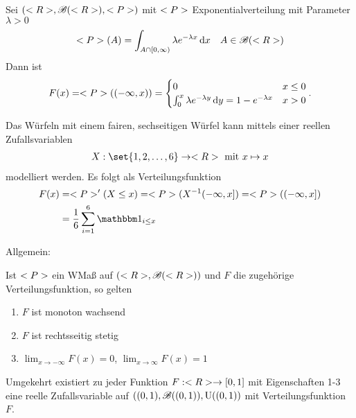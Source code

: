 
\begin{example}
	Sei $(<R>, \mathscr{B}(<R>),<P>)$ mit $<P>$ Exponentialverteilung mit Parameter $\lambda > 0$
	\begin{align}
		<P>(A) = \int_{A \cap [0,\infty)}\lambda e^{-\lambda x} \,\mathrm{d} x \quad A \in \mathscr{B}(<R>)\notag
	\end{align}
	Dann ist
	\begin{align}
		F(x) = <P>((-\infty, x)) = \begin{cases}
		0 &x \le 0\\
		\int_{0}^{x} \lambda e^{-\lambda y} \,\mathrm{d} y = 1 - e^{-\lambda x} &x > 0
		\end{cases}.\notag
	\end{align}
\end{example}

\begin{center}
	
\end{center}

\begin{example}
	Das Würfeln mit einem fairen, sechseitigen Würfel kann mittels einer reellen Zufallsvariablen
	\begin{align}
		X: \set{1,2,\dots, 6} \to \R \mit x \mapsto x\notag
	\end{align}
	modelliert werden. Es folgt als Verteilungsfunktion
	\begin{align}
		F(x) &= \probp'(X \le x) = \probp(X^{-1}(-\infty,x]) = \probp((-\infty,x])\notag\\
		&= \frac{1}{6}\sum_{i=1}^{6} \indi_{i \le x}\notag
	\end{align}
\end{example}

\begin{center}
	
\end{center}

Allgemein:

\begin{proposition}
	Ist $<P>$ ein WMaß auf $(<R>, \mathscr{B}(<R>))$ und $F$ die zugehörige Verteilungsfunktion, so gelten
	\begin{enumerate}
		\item $F$ ist monoton wachsend
		\item $F$ ist rechtsseitig stetig
		\item $\lim_{x\to -\infty} F(x) = 0$, $\lim_{x\to \infty} F(x) = 1$
	\end{enumerate}
	Umgekehrt existiert zu jeder Funktion $F: <R> \to [0,1]$ mit Eigenschaften 1-3 eine reelle Zufallsvariable auf $((0,1), \mathscr{B}((0,1)), \mathrm{U}((0,1))$ mit Verteilungsfunktion $F$.
\end{proposition}


